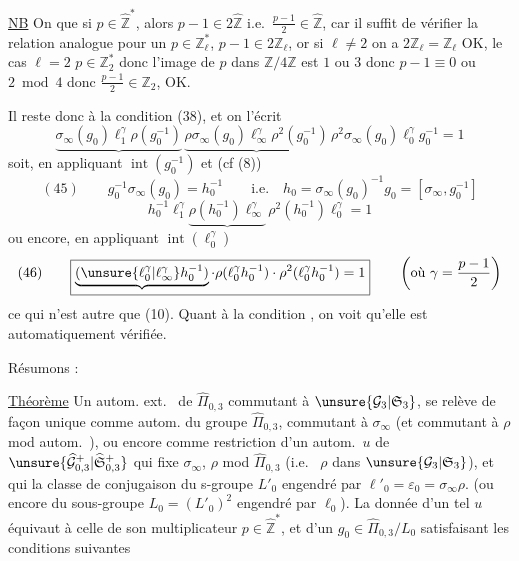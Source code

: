 \quad
\uline{NB} On  que si $p\in\widehat{\mathbb Z}^{*}$, alors
$p-1\in 2\widehat{\mathbb Z}$ i.e.\ $\frac{p-1}{2}\in\widehat{\mathbb Z}$,
car il suffit de vérifier la relation analogue pour un $p\in\mathbb Z_\ell^{*}$,
 $p-1\in 2\mathbb Z_\ell$, or si $\ell\ne2$ on a
$2\mathbb Z_\ell=\mathbb Z_\ell$ OK,  le cas $\ell=2$
$p\in\mathbb Z_2^{*}$ donc l'image de $p$ dans $\mathbb Z/4\mathbb Z$
est $1$ ou $3$ donc $p-1\equiv0$ ou $2\bmod4$
 donc $\frac{p-1}{2}\in\mathbb Z_2$, OK.

\par
Il reste donc à  la condition (38), et on l'écrit
\[
\underbrace{\sigma_\infty(g_0)\ell_1^\gamma\rho(g_0^{-1})}\,
\underbrace{\rho\sigma_\infty(g_0)\ell_\infty^\gamma\rho^2(g_0^{-1})}\,
\rho^2\sigma_\infty(g_0)\ell_0^\gamma g_0^{-1}=1
\]
soit, en appliquant $\operatorname{int}(g_0^{-1})$ et
(cf (8))
\[
(45)\qquad g_0^{-1}\sigma_\infty(g_0)=h_0^{-1}
\qquad\text{i.e.}\quad
h_0=\sigma_\infty(g_0)^{-1}g_0=[\sigma_\infty,g_0^{-1}]
\]
\[
h_0^{-1}\ell_1^\gamma\underbrace{\rho(h_0^{-1})\ell_\infty^\gamma}\,
\rho^2(h_0^{-1})\ell_0^\gamma=1
\]
ou encore, en appliquant $\operatorname{int}(\ell_0^\gamma)$
\[
(46)\qquad
\boxed{\underbrace{(\unsure{\ell_0^\gamma|\ell_\infty^\gamma}h_0^{-1})}\cdot
\rho(\ell_0^\gamma h_0^{-1})\cdot\rho^2(\ell_0^\gamma h_0^{-1})=1}
\qquad\left(\text{où }\gamma=\frac{p-1}{2}\right)
\]
ce qui n'est autre que (10). Quant à la condition ,
on voit qu'elle est  automatiquement vérifiée.


Résumons :

\uline{Théorème} Un autom. ext.\  de
$\widehat{\Pi}_{0,3}$ commutant à
$\unsure{\mathcal G_3|\mathfrak S_3}$, se relève de façon unique comme autom.
du groupe  $\widehat{\Pi}_{0,3}$, commutant à
$\sigma_\infty$ (et commutant à $\rho$ mod autom.\ ),
ou encore comme restriction d'un autom.\ $u$ de
$\unsure{\widehat{\mathcal G}_{0,3}^{+}|\widehat{\mathfrak S}_{0,3}^{+}}$
qui fixe $\sigma_\infty$,  $\rho$ mod $\widehat{\Pi}_{0,3}$
(i.e.\  $\rho$ dans $\unsure{\mathcal G_3|\mathfrak S_3}$),
et qui  la classe de conjugaison du s-groupe
 $L'_0$
 engendré par $\ell'_0=\varepsilon_0=\sigma_\infty\rho$.
(ou encore du sous-groupe  $L_0=(L'_0)^2$ engendré par $\ell_0$).
La donnée d'un tel $u$ équivaut à celle de son multiplicateur
$p\in\widehat{\mathbb Z}^{*}$, et d'un $g_0\in\widehat{\Pi}_{0,3}/L_0$
satisfaisant les conditions suivantes


